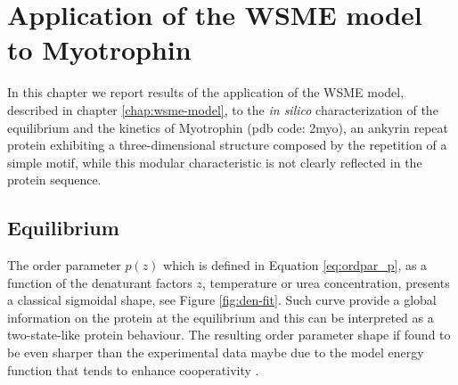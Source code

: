 \chapter{Application of  the WSME model to Myotrophin}
\label{chap:wsme-results}
\nopagebreak

In this chapter we report results of the application of the WSME model, described
in chapter \ref{chap:wsme-model}, to the \emph{in silico} characterization of
the equilibrium and the kinetics of Myotrophin (pdb code: 2myo), an ankyrin
repeat protein  exhibiting a three-dimensional structure composed by the
repetition of a simple motif, while this modular characteristic is not clearly
reflected in the protein sequence.


\section{Equilibrium}


The order parameter $p(z)$ which is defined in Equation \ref{eq:ordpar_p}, as a
function of the denaturant factors $z$, temperature
or urea concentration, presents a classical sigmoidal shape, see Figure
\ref{fig:den-fit}.
Such curve provide a global information on the protein at the equilibrium and
this can be
interpreted as a two-state-like protein behaviour.
The resulting order parameter shape if found to be even sharper than the
experimental data maybe due to the model energy function that tends to enhance
cooperativity \cite{Abe2006}.

